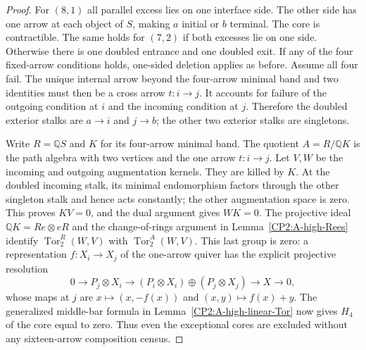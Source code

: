 \begin{proof}
For $(8,1)$ all parallel excess lies on one interface
side.  The other side has one arrow at each object
of $S$, making $a$ initial or $b$ terminal.  The
core is contractible.  The same holds for $(7,2)$
if both excesses lie on one side.  Otherwise there
is one doubled entrance and one doubled exit.
If any of the four fixed-arrow conditions holds,
one-sided deletion applies as before.  Assume all
four fail.  The unique internal arrow beyond the
four-arrow minimal band and two identities must
then be a cross arrow $t:i\to j$.  It accounts
for failure of the outgoing condition at $i$ and
the incoming condition at $j$.  Therefore the
doubled exterior stalks are $a\to i$ and $j\to b$;
the other two exterior stalks are singletons.

Write $R=\mathbb QS$ and $K$ for its four-arrow
minimal band.  The quotient $A=R/\mathbb QK$ is
the path algebra with two vertices and the one
arrow $t:i\to j$.  Let $V,W$ be the incoming and
outgoing augmentation kernels.  They are killed
by $K$.  At the doubled incoming stalk, its
minimal endomorphism factors through the other
singleton stalk and hence acts constantly; the
other augmentation space is zero.  This proves
$KV=0$, and the dual argument gives $WK=0$.
The projective ideal $\mathbb QK=Re\otimes eR$
and the change-of-rings argument in
Lemma~\ref{CP2:A-high-Rees} identify
$\operatorname{Tor}_2^R(W,V)$ with
$\operatorname{Tor}_2^A(W,V)$.
This last group is zero: a representation
$f:X_i\to X_j$ of the one-arrow quiver has the
explicit projective resolution
\[
 0\to P_j\otimes X_i\to
 (P_i\otimes X_i)\oplus(P_j\otimes X_j)
 \to X\to0,
\]
whose maps at $j$ are $x\mapsto(x,-f(x))$ and
$(x,y)\mapsto f(x)+y$.  The generalized middle-bar
formula in Lemma~\ref{CP2:A-high-linear-Tor}
now gives $H_4$ of the core equal to zero.
Thus even the exceptional cores are excluded
without any sixteen-arrow composition census.
\end{proof}

